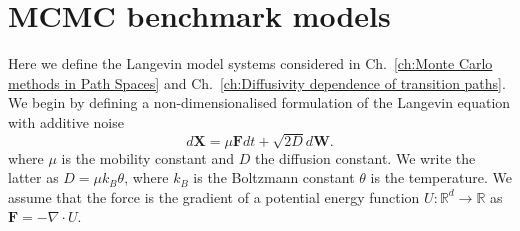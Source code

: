 \documentclass[]{cam-thesis}
\begin{document}
%

\renewcommand{\bibname}{References}
\cleardoublepage
{}
{}
%


%







\cleardoublepage
{}
\appendix
{}



\chapter{MCMC benchmark models} \label{app:MCMC benchmark models}

Here we define the Langevin model systems considered in Ch.~\ref{ch:Monte Carlo methods in Path Spaces} and Ch.~\ref{ch:Diffusivity dependence of transition paths}. We begin by defining a non-dimensionalised formulation of the Langevin equation with additive noise
\begin{equation}
d\mathbf{X}=\mu\mathbf{F}dt+\sqrt{2D}d\mathbf{W}.
\end{equation}
where $\mu$ is the mobility constant and $D$ the diffusion constant. We write the latter as $D = \mu k_B \theta$, where $k_B$ is the Boltzmann constant $\theta$ is the temperature. We assume that the force is the gradient of a potential energy function $U : \mathbb{R}^d \to \mathbb{R}$  as $\mathbf{F} = - \nabla \cdot U$.
\end{document}
